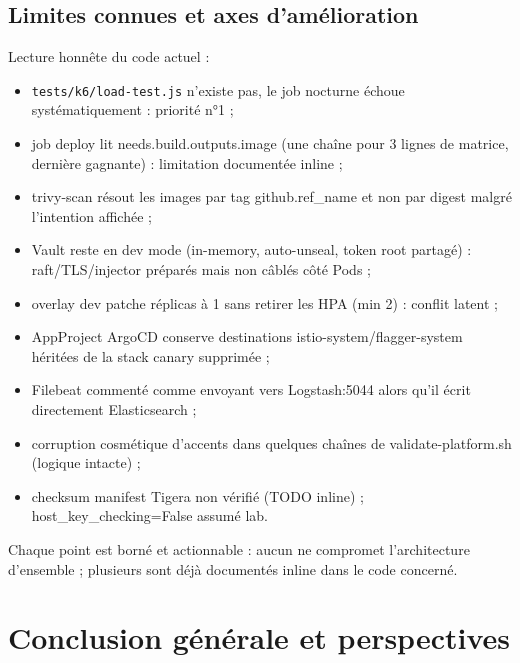 \documentclass[12pt,a4paper,oneside]{report}
\makeatletter
\def\cleardoublepage{\clearpage\if@twoside
  \ifodd\c@page\else\hbox{}\thispagestyle{empty}\newpage\fi\fi}
\makeatother
\begin{document}
\section{Limites connues et axes d'amélioration}

Lecture honnête du code actuel :
\begin{itemize}[itemsep=2pt]
  \item \texttt{tests/k6/load-test.js} n'existe pas, le job nocturne échoue systématiquement : priorité n°1 ;
  \item job deploy lit needs.build.outputs.image (une chaîne pour 3 lignes de matrice, dernière gagnante) : limitation documentée inline ;
  \item trivy-scan résout les images par tag github.ref\_name et non par digest malgré l'intention affichée ;
  \item Vault reste en dev mode (in-memory, auto-unseal, token root partagé) : raft/TLS/injector préparés mais non câblés côté Pods ;
  \item overlay dev patche réplicas à 1 sans retirer les HPA (min 2) : conflit latent ;
  \item AppProject ArgoCD conserve destinations istio-system/flagger-system héritées de la stack canary supprimée ;
  \item Filebeat commenté comme envoyant vers Logstash:5044 alors qu'il écrit directement Elasticsearch ;
  \item corruption cosmétique d'accents dans quelques chaînes de validate-platform.sh (logique intacte) ;
  \item checksum manifest Tigera non vérifié (TODO inline) ; host\_key\_checking=False assumé lab.
\end{itemize}

Chaque point est borné et actionnable : aucun ne compromet l'architecture d'ensemble ; plusieurs sont déjà documentés inline dans le code concerné.


\cleardoublepage
\chapter*{Conclusion générale et perspectives}
\end{document}
